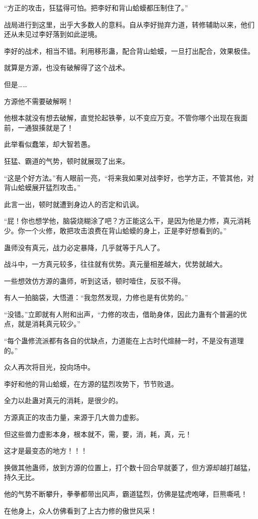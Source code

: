 \begin{this_body}
“方正的攻击，狂猛得可怕。把李好和背山蛤蟆都压制住了。”

战局进行到这里，出乎大多数人的意料。自从李好抛弃力道，转修辅助以来，他们还从未见过李好落到如此逆境。

李好的战术，相当不错。利用移形蛊，配合背山蛤蟆，一旦打出配合，效果极佳。

就算是方源，也没有破解得了这个战术。

但是……

方源他不需要破解啊！

他根本就没有想去破解，直觉抡起铁拳，以不变应万变。不管你哪个出现在我面前，一通狠揍就是了！

此举看似蠢笨，却大智若愚。

狂猛、霸道的气势，顿时就展现了出来。

“这是个好方法。”有人眼前一亮，“将来我如果对战李好，也学方正，不管其他，对背山蛤蟆展开猛烈攻击。”

此言一出，顿时就遭到身边人的否定和讥讽。

“屁！你也想学他，脑袋烧糊涂了吧？方正能这么干，是因为他是力修，真元消耗少。你一个火修，敢把攻击浪费在背山蛤蟆的身上，正是李好想看到的。”

蛊师没有真元，战力必定暴降，几乎就等于凡人了。

战斗中，一方真元较多，往往就有优势。真元量相差越大，优势就越大。

一些想效仿方源的蛊师，听到这话，顿时噎住，反驳不得。

有人一拍脑袋，大悟道：“我忽然发现，力修也是有优势的。”

“没错。”立即就有人附和出声，“力修的攻击，借助身体，因此力蛊有个普遍的优点，就是消耗真元较少。”

“每个蛊修流派都有各自的优缺点，力道能在上古时代煊赫一时，不是没有道理的。”

众人再次将目光，投向场中。

李好和他的背山蛤蟆，在方源的猛烈攻势下，节节败退。

全力以赴蛊对真元的消耗，是很少的。

方源真正的攻击力量，来源于几大兽力虚影。

但这些兽力虚影本身，根本就不，需，要，消，耗，真，元！

这才是最变态的地方！！！

换做其他蛊师，放到方源的位置上，打个数十回合早就萎了，但方源却越打越猛，持久无比。

他的气势不断攀升，拳拳都带出风声，霸道猛烈，仿佛是猛虎咆哮，巨熊嘶吼！

在他身上，众人仿佛看到了上古力修的傲世风采！


\end{this_body}
